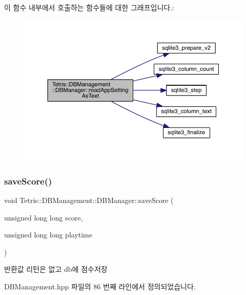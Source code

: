 이 함수 내부에서 호출하는 함수들에 대한 그래프입니다.\+:
\nopagebreak
\begin{figure}[H]
\begin{center}
\leavevmode
\includegraphics[width=350pt]{class_tetris_1_1_d_b_management_1_1_d_b_manager_acb213c517f06d1eadafd45a86b91c2ff_cgraph}
\end{center}
\end{figure}
\mbox{\label{class_tetris_1_1_d_b_management_1_1_d_b_manager_aef16da1d2e564caa309bfc3b3e419d7e}} 
\subsubsection{\texorpdfstring{save\+Score()}{saveScore()}}
{\footnotesize\ttfamily void Tetris\+::\+D\+B\+Management\+::\+D\+B\+Manager\+::save\+Score (\begin{DoxyParamCaption}\item[{unsigned long long}]{score,  }\item[{unsigned long long}]{playtime }\end{DoxyParamCaption})\hspace{0.3cm}{\ttfamily [inline]}}

\begin{DoxyReturn}{반환값}
리턴은 없고 db에 점수저장 
\end{DoxyReturn}


D\+B\+Management.\+hpp 파일의 86 번째 라인에서 정의되었습니다.


